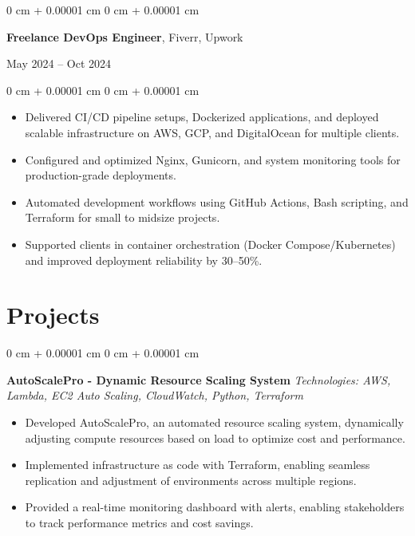 \documentclass[10pt, letterpaper]{article}
\newenvironment{highlights}{
    \begin{itemize}[
        topsep=0.10 cm,
        parsep=0.10 cm,
        partopsep=0pt,
        itemsep=0pt,
        leftmargin=0 cm + 10pt
    ]
}{
    \end{itemize}
}
\newenvironment{onecolentry}{
    \begin{adjustwidth}{
        0 cm + 0.00001 cm
    }{
        0 cm + 0.00001 cm
    }
}{
    \end{adjustwidth}
}
\newenvironment{twocolentry}[2][]{
    \onecolentry
    \def\secondColumn{#2}
    \setcolumnwidth{\fill, 4.5 cm}
    \begin{paracol}{2}
}{
    \switchcolumn \raggedleft \secondColumn
    \end{paracol}
    \endonecolentry
}
\begin{document}
\vspace{0.10 cm}

\begin{twocolentry}{May 2024 – Oct 2024}
    \textbf{Freelance DevOps Engineer}, Fiverr, Upwork
\end{twocolentry}
\vspace{0.10 cm}
\begin{onecolentry}
    \begin{highlights}
        \item Delivered CI/CD pipeline setups, Dockerized applications, and deployed scalable infrastructure on AWS, GCP, and DigitalOcean for multiple clients.
        \item Configured and optimized Nginx, Gunicorn, and system monitoring tools for production-grade deployments.
        \item Automated development workflows using GitHub Actions, Bash scripting, and Terraform for small to midsize projects.
        \item Supported clients in container orchestration (Docker Compose/Kubernetes) and improved deployment reliability by 30–50\%.
    \end{highlights}
\end{onecolentry}

\section{Projects}
\vspace{0.10 cm}
\begin{onecolentry}
    \textbf{AutoScalePro - Dynamic Resource Scaling System}
    \textit{Technologies: AWS, Lambda, EC2 Auto Scaling, CloudWatch, Python, Terraform}
    \begin{highlights}
        \item Developed AutoScalePro, an automated resource scaling system, dynamically adjusting compute resources based on load to optimize cost and performance.
        \item Implemented infrastructure as code with Terraform, enabling seamless replication and adjustment of environments across multiple regions.
        \item Provided a real-time monitoring dashboard with alerts, enabling stakeholders to track performance metrics and cost savings.
    \end{highlights}
\end{onecolentry}
\vspace{0.10 cm}
\end{document}
